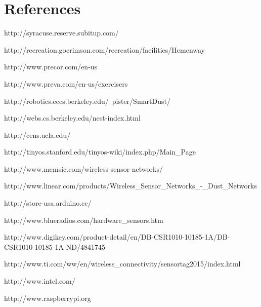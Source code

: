 \documentclass[PPFS.tex]{template/subfiles}
\begin{document}
\section{References}

\renewcommand{\section}[2]{} %

\begin{thebibliography}{}


http://syracuse.reserve.subitup.com/

http://recreation.gocrimson.com/recreation/facilities/Hemenway

http://www.precor.com/en-us

http://www.preva.com/en-us/exercisers

http://robotics.eecs.berkeley.edu/~pister/SmartDust/

http://webs.cs.berkeley.edu/nest-index.html

http://cens.ucla.edu/

http://tinyos.stanford.edu/tinyos-wiki/index.php/Main\_Page

http://www.memsic.com/wireless-sensor-networks/

http://www.linear.com/products/Wireless\_Sensor\_Networks\_-\_Dust\_Networks

http://store-usa.arduino.cc/

http://www.blueradios.com/hardware\_sensors.htm

http://www.digikey.com/product-detail/en/DB-CSR1010-10185-1A/DB-CSR1010-10185-1A-ND/4841745

http://www.ti.com/ww/en/wireless\_connectivity/sensortag2015/index.html

http://www.intel.com/

http://www.raspberrypi.org


\end{thebibliography}
\end{document}
